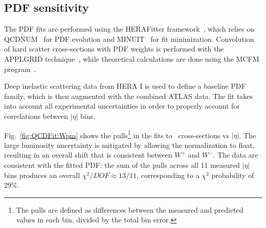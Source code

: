 \subsection{ PDF sensitivity }

The PDF fits are performed using the HERAFitter framework~\cite{HERAFitter,Aaron:2009aa,Aaron:2009kv}, which relies on QCDNUM~\cite{Botje:2010ay} for PDF evolution and MINUIT~\cite{James:1975dr} for fit minimization. Convolution of hard scatter cross-sections with PDF weights is performed with the APPLGRID technique~\cite{Carli:2010rw}, while theoretical calculations are done using the MCFM program~\cite{Campbell:2010ff}.

Deep inelastic scattering data from HERA I is used to define a baseline PDF family, which is then augmented with the combined ATLAS data. The fit takes into account all experimental uncertainties in order to properly account for correlations between $|\eta|$ bins.

Fig.~\ref{fig:QCDFit:Wpm} shows the pulls\footnote{The pulls are defined as differences between the measured and predicted values in each bin, divided by the total bin error.} in the fits to \Wpm\ cross-sections vs $|\eta|$. The large luminosity uncertainty is mitigated by allowing the normalization to float, resulting in an overall shift that is consistent between $W^+$ and $W^-$. The data are consistent with the fitted PDF: the sum of the pulls across all 11 measured $|\eta|$ bins produces an overall $\chi^{2}/DOF \approx 13/11$, corresponding to a $\chi^{2}$ probability of 29\%.

